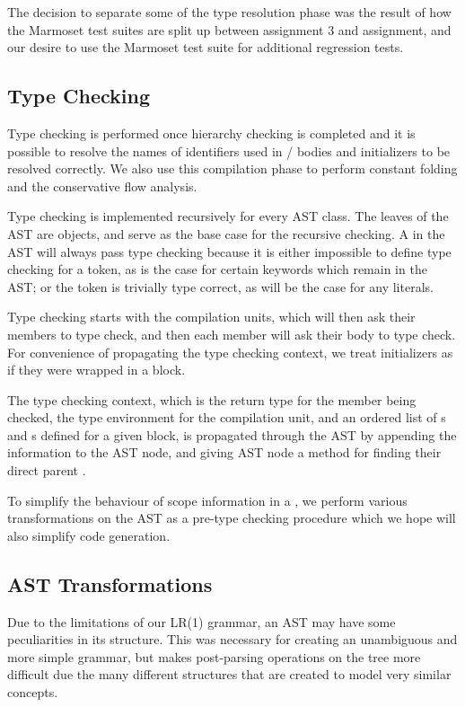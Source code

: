 \documentclass[pdftex,11pt,a4paper]{article}
\begin{document}
The decision to separate some of the type resolution phase was the
result of how the Marmoset test suites are split up between assignment
3 and assignment, and our desire to use the Marmoset test suite for
additional regression tests.


\subsection{Type Checking}

Type checking is performed once hierarchy checking is completed and it
is possible to resolve the names of identifiers used in
/ bodies and  initializers to
be resolved correctly. We also use this compilation phase to perform
constant folding and the conservative flow analysis.

Type checking is implemented recursively for every AST class. The
leaves of the AST are  objects, and serve as the base case
for the recursive checking. A  in the AST will always pass
type checking because it is either impossible to define type checking
for a token, as is the case for certain keywords which remain in the
AST; or the token is trivially type correct, as will be the case for
any literals.

Type checking starts with the compilation units, which will then ask
their members to type check, and then each member will ask their body
to type check. For convenience of propagating the type checking
context, we treat  initializers as if they were wrapped in
a block.

The type checking context, which is the return type for the member
being checked, the type environment for the compilation unit, and an
ordered list of s and s
defined for a given block, is propagated through the AST by appending
the information to the  AST node, and giving AST node a
method for finding their direct parent .

To simplify the behaviour of scope information in a , we
perform various transformations on the AST as a pre-type checking
procedure which we hope will also simplify code generation.


\subsection{AST Transformations}

Due to the limitations of our LR(1) grammar, an AST may have some
peculiarities in its structure. This was necessary for creating an
unambiguous and more simple grammar, but makes post-parsing operations
on the tree more difficult due the many different structures that are
created to model very similar concepts.
\end{document}
